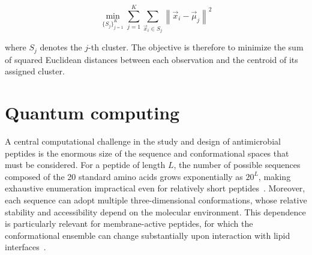 \begin{equation}
    \min_{\{S_j\}_{j=1}^{K}}
    \sum_{j=1}^{K}
    \sum_{\vec{x}_i \in S_j}
    \left\|
    \vec{x}_i-\vec{\mu}_j
    \right\|^2
\end{equation}

where $S_j$ denotes the $j$-th cluster. The objective is therefore to minimize the sum of squared Euclidean distances between each observation and the centroid of its assigned cluster.




























































\section{Quantum computing}
A central computational challenge in the study and design of antimicrobial peptides is the enormous size of the sequence and conformational spaces that must be considered. For a peptide of length \(L\), the number of possible sequences composed of the 20 standard amino acids grows exponentially as \(20^L\), making exhaustive enumeration impractical even for relatively short peptides~\cite{Levinthal_paradox,robert2021resource}. Moreover, each sequence can adopt multiple three-dimensional conformations, whose relative stability and accessibility depend on the molecular environment. This dependence is particularly relevant for membrane-active peptides, for which the conformational ensemble can change substantially upon interaction with lipid interfaces~\cite{paper_paula,vogel_amps}.


